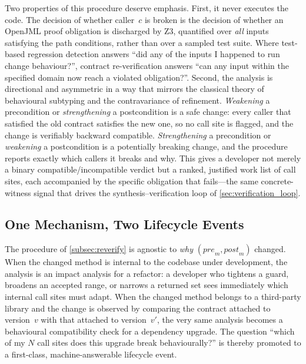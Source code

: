 Two properties of this procedure deserve emphasis. First, it never executes the
code. The decision of whether caller~$c$ is broken is the decision of whether an
OpenJML proof obligation is discharged by Z3, quantified over \emph{all} inputs
satisfying the path conditions, rather than over a sampled test suite. Where
test-based regression detection answers ``did any of the inputs I happened to run
change behaviour?'', contract re-verification answers ``can any input within the
specified domain now reach a violated obligation?''. Second, the analysis is
directional and asymmetric in a way that mirrors the classical theory of
behavioural subtyping and the contravariance of refinement. \emph{Weakening} a
precondition or \emph{strengthening} a postcondition is a safe change: every
caller that satisfied the old contract satisfies the new one, so no call site is
flagged, and the change is verifiably backward compatible. \emph{Strengthening}
a precondition or \emph{weakening} a postcondition is a potentially breaking
change, and the procedure reports exactly which callers it breaks and why. This
gives a developer not merely a binary compatible/incompatible verdict but a
ranked, justified work list of call sites, each accompanied by the specific
obligation that fails---the same concrete-witness signal that drives the
synthesis--verification loop of \cref{sec:verification_loop}.

\subsection{One Mechanism, Two Lifecycle Events}\label{subsec:onemech}

The procedure of \cref{subsec:reverify} is agnostic to \emph{why}
$(\mathit{pre}_m, \mathit{post}_m)$ changed. When the changed method is internal
to the codebase under development, the analysis is an impact analysis for a
refactor: a developer who tightens a guard, broadens an accepted range, or
narrows a returned set sees immediately which internal call sites must adapt.
When the changed method belongs to a third-party library and the change is
observed by comparing the contract attached to version~$v$ with that attached to
version~$v'$, the very same analysis becomes a behavioural compatibility check for
a dependency upgrade. The question ``which of my $N$ call sites does this upgrade
break behaviourally?'' is thereby promoted to a first-class, machine-answerable
lifecycle event.

